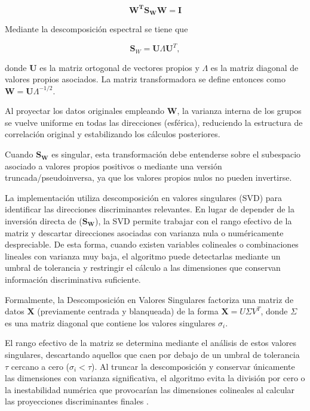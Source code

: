 \begin{equation}
	\mathbf{W^TS_WW = I}
	\label{eq:EMT9}
\end{equation}

Mediante la descomposición espectral se tiene que 

\begin{equation}
	\mathbf{S}_W = \mathbf{U} \Lambda \mathbf{U}^T,
	\label{eq:EMT10}
\end{equation}

donde $\mathbf{U}$ es la matriz ortogonal de vectores propios y $\Lambda$ es la matriz diagonal de valores propios asociados. La matriz transformadora se define entonces como $\mathbf{W} = \mathbf{U} \Lambda^{-1/2}$.

Al proyectar los datos originales empleando $\mathbf{W}$, la varianza interna de los grupos se vuelve uniforme en todas las direcciones (esférica), reduciendo la estructura de correlación original y estabilizando los cálculos posteriores.

Cuando $\mathbf{S_W}$ es singular, esta transformación debe entenderse sobre el subespacio asociado a valores propios positivos o mediante una versión truncada/pseudoinversa, ya que los valores propios nulos no pueden invertirse.

La implementación utiliza descomposición en valores singulares (SVD) para identificar las direcciones discriminantes relevantes. En lugar de depender de la inversión directa de ($\mathbf{S_W}$), la SVD permite trabajar con el rango efectivo de la matriz y descartar direcciones asociadas con varianza nula o numéricamente despreciable. De esta forma, cuando existen variables colineales o combinaciones lineales con varianza muy baja, el algoritmo puede detectarlas mediante un umbral de tolerancia y restringir el cálculo a las dimensiones que conservan información discriminativa suficiente.

Formalmente, la Descomposición en Valores Singulares factoriza una matriz de datos $\mathbf{X}$ (previamente centrada y blanqueada) de la forma $\mathbf{X} = U \Sigma V^T$, donde $\Sigma$ es una matriz diagonal que contiene los valores singulares $\sigma_i$. 

El rango efectivo de la matriz se determina mediante el análisis de estos valores singulares, descartando aquellos que caen por debajo de un umbral de tolerancia $\tau$ cercano a cero ($\sigma_i < \tau$). Al truncar la descomposición y conservar únicamente las dimensiones con varianza significativa, el algoritmo evita la división por cero o la inestabilidad numérica que provocarían las dimensiones colineales al calcular las proyecciones discriminantes finales \cite{golub2013matrix}.

